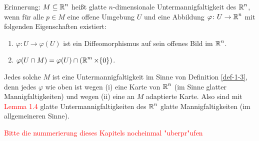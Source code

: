 \begin{Bem}
  Erinnerung: $M \subseteq \operatorname{\mathbb{R}}^n$ heißt glatte $n$-dimensionale Untermannigfaltigkeit des $\operatorname{\mathbb{R}}^n$, wenn für alle $p \in M$ eine offene Umgebung $U$ und eine Abbildung $\varphi \colon U \to \operatorname{\mathbb{R}}^n$  mit folgenden Eigenschaften existiert:
  \begin{enumerate}[label=(\roman*),widest=ii]
  \item $\varphi \colon U \to \varphi(U)$ ist ein Diffeomorphismus auf sein offenes Bild im $\operatorname{\mathbb{R}}^{n}$.
  \item $\varphi(U \cap M) = \varphi(U) \cap (\operatorname{\mathbb{R}}^{m} \times \{0\})$.
  \end{enumerate}
Jedes solche $M$ ist eine Untermannigfaltigkeit im Sinne von Definition \ref{def-1-3}, denn jedes $\varphi$ wie oben ist wegen (i) eine Karte von $\operatorname{\mathbb{R}}^n$ (im Sinne glatter Mannigfaltigkeiten) und wegen (ii) eine an $M$ adaptierte Karte. Also sind mit \textcolor{red}{Lemma 1.4} glatte Untermannigfaltigkeiten des $\operatorname{\mathbb{R}}^n$ glatte Mannigfaltigkeiten (im allgemeineren Sinne).
\end{Bem}

\textcolor{red}{Bitte die nummerierung dieses Kapitels nocheinmal "uberpr"ufen}

